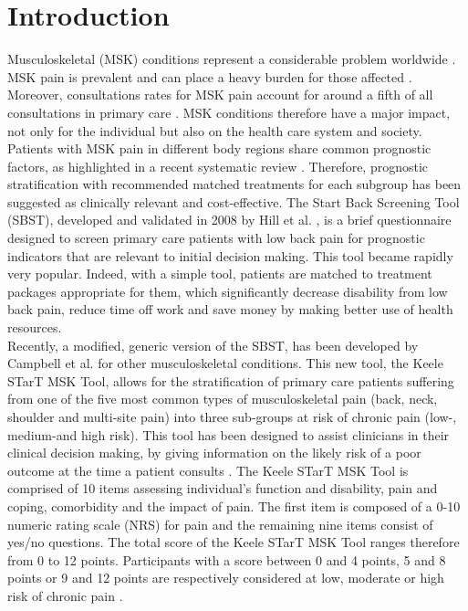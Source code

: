 \section{Introduction}
\textbf{}
\setlength{\parindent}{5ex}
Musculoskeletal (MSK) conditions represent a considerable problem worldwide \citep{murray2012disability,blyth2019global}. MSK pain is prevalent and can place a heavy burden for those affected \citep{wijnhoven2006prevalence}. Moreover, consultations rates for MSK pain account for around a fifth of all consultations in primary care \citep{jordan2010annual}. MSK conditions therefore have a major impact, not only for the individual but also on the health care system and society.\\ 
Patients with MSK pain in different body regions share common prognostic factors, as highlighted in a recent systematic review \citep{artus2017generic}. Therefore, prognostic stratification with recommended matched treatments for each subgroup has been suggested as clinically relevant and cost-effective. The Start Back Screening Tool (SBST), developed and validated in 2008 by Hill et al. \citep{hill2011comparison, jc59lewis}, is a brief questionnaire designed to screen primary care patients with low back pain for prognostic indicators that are relevant to initial decision making. This tool became rapidly very popular. Indeed, with a simple tool, patients are matched to treatment packages appropriate for them, which significantly decrease disability from low back pain, reduce time off work and save money by making better use of health resources.\\
Recently, a modified, generic version of the SBST, has been developed by Campbell et al. \citep{campbell2016keele} for other musculoskeletal conditions. This new tool, the Keele STarT MSK Tool, allows for the stratification of primary care patients suffering from one of the five most common types of musculoskeletal pain (back, neck, shoulder and multi-site pain) into three sub-groups at risk of chronic pain (low-, medium-and high risk). This tool has been designed to assist clinicians in their clinical decision making, by giving information on the likely risk of a poor outcome at the time a patient consults \citep{saunders2020stratified, hill2020stratified}. The Keele STarT MSK Tool is comprised of 10 items assessing individual’s function and disability, pain and coping, comorbidity and the impact of pain. The first item is composed of a 0-10 numeric rating scale (NRS) for pain and the remaining nine items consist of yes/no questions. The total score of the Keele STarT MSK Tool ranges therefore from 0 to 12 points. Participants with a score between 0 and 4 points, 5 and 8 points or 9 and 12 points are respectively considered at low, moderate or high risk of chronic pain \citep{dunn2021refinement}. \\
